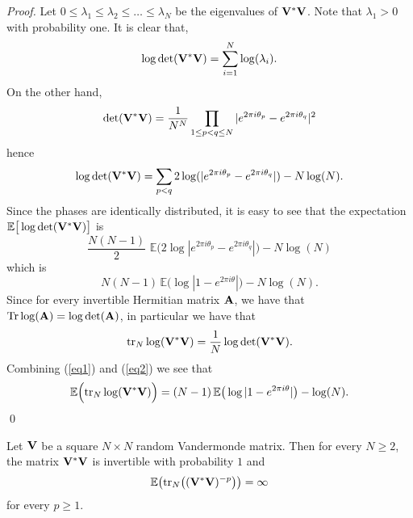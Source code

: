 \documentclass[smallextended]{svjour3}
\begin{document}
\begin{proof}
Let $0\leq \lambda_{1}\leq \lambda_{2}\leq \ldots \leq \lambda_{N}$ be the eigenvalues of ${\bf V}^{*}{\bf V}$. Note that $\lambda_{1}>0$ with probability one. It is clear that, 
\begin{equation}
\log\det({\bf V}^{*}{\bf V})=\sum_{i=1}^{N}{\log(\lambda_{i})}.
\end{equation}
On the other hand,
$$
\det({\bf V}^{*}{\bf V})=\frac{1}{N^{N}}\prod_{1\leq p<q\leq N}{|e^{2\pi i\theta_{p}}-e^{2\pi i\theta_{q}}|^2}
$$
hence
\begin{equation}
\log\det({\bf V}^{*}{\bf V})=\sum_{p<q}{2\log(|e^{2\pi i\theta_{p}}-e^{2\pi i\theta_{q}}|)}-N\log(N).
\end{equation}
Since the phases are identically distributed, it is easy to see that the expectation $\mathbb{E}\big[\log\det({\bf V}^{*}{\bf V})\big]$
is
\begin{equation}\label{eq1}
\frac{N(N-1)}{2}\,\,\mathbb{E}\Big(2\log |e^{2\pi i\theta_{p}}-e^{2\pi i\theta_{q}}| \Big)-N\log(N) 
\end{equation}
which is
\begin{equation}
N(N-1)\,\mathbb{E}\Big(\log |1-e^{2\pi i\theta}| \Big)-N\log(N).
\end{equation}
Since for every invertible Hermitian matrix ${\bf A}$, we have that $\mathrm{Tr}\log({\bf A})=\log\det({\bf A})$, in particular we have that
\begin{equation}\label{eq2}
\mathrm{tr}_{N}\log({\bf V}^{*}{\bf V})=\frac{1}{N}\log\det({\bf V}^{*}{\bf V}).
\end{equation}
Combining (\ref{eq1}) and (\ref{eq2}) we see that 
\begin{equation}
\mathbb{E}\Big(\mathrm{tr}_{N}\log({\bf V}^{*}{\bf V})\Big)=(N-1)\,\mathbb{E}\big(\log |1-e^{2\pi i\theta}| \big)-\log(N).
\end{equation}
\qed \end{proof}

\begin{theorem}\label{momentsinv}
Let ${\bf V}$ be a square $N\times N$ random Vandermonde matrix. Then for every $N\geq 2$, the matrix ${\bf V^{*}}{\bf V}$ is invertible with probability $1$ and 
$$
\mathbb{E}\big(\mathrm{tr}_{N}\big(({\bf V^{*}}{\bf V})^{-p}\big)\big)=\infty
$$
for every $p\geq 1$.
\end{theorem}
\end{document}
